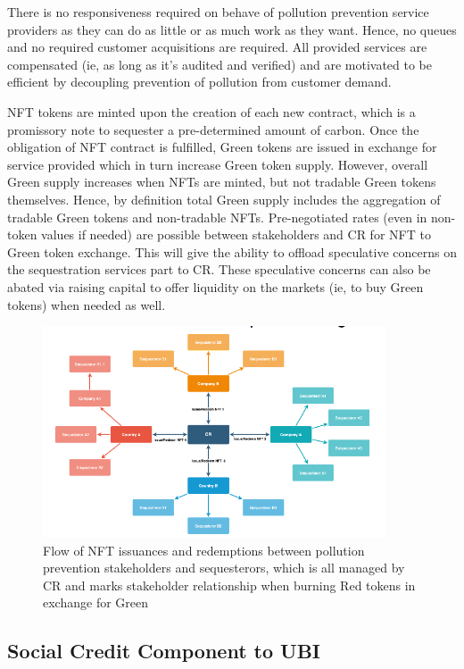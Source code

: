 \documentclass{article}
\begin{document}
There is no responsiveness required on behave of pollution prevention service providers as they can do as little or as much work as they want. Hence, no queues and no required customer acquisitions are required. All provided services are compensated (ie, as long as it's audited and verified) and are motivated to be efficient by decoupling prevention of pollution from customer demand.

NFT tokens are minted upon the creation of each new contract, which is a promissory note to sequester a pre-determined amount of carbon. Once the obligation of NFT contract is fulfilled, Green tokens are issued in exchange for service provided which in turn increase Green token supply. However, overall Green supply increases when NFTs are minted, but not tradable Green tokens themselves. Hence, by definition total Green supply includes the aggregation of tradable Green tokens and non-tradable NFTs. Pre-negotiated rates (even in non-token values if needed) are possible between stakeholders and CR for NFT to Green token exchange. This will give the ability to offload speculative concerns on the sequestration services part to CR. These speculative concerns can also be abated via raising capital to offer liquidity on the markets (ie, to buy Green tokens) when needed as well.

\begin{figure}[h]
\centering
\includegraphics[width=4in]{red_green_issue.png}
\caption{Flow of NFT issuances and redemptions between pollution prevention stakeholders and sequesterors, which is all managed by CR and marks stakeholder relationship when burning Red tokens in exchange for Green} 
\label{fig:red_green_issue}
\end{figure} 

\subsection{Social Credit Component to UBI}
\end{document}
